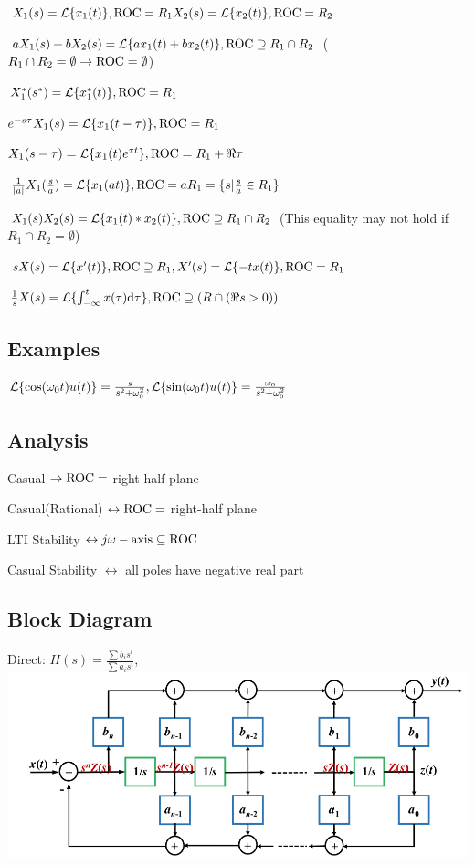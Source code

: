 $X_1(s)=\mathcal L\{ x_1(t)\},\text{ROC}=R_1 \\ X_2(s)=\mathcal L\{ x_2(t)\},\text{ROC}=R_2$

$aX_1(s) + bX_2(s) = \mathcal L\{ax_1(t) + bx_2(t)\}, \text{ROC}\supseteq R_1\cap R_2 $ 
($R_1\cap R_2=\emptyset\to \text{ROC}=\emptyset$)

$X_1^*(s^*)=\mathcal L\{x_1^*(t)\}, \text{ROC}=R_1$

$e^{-s\tau}X_1(s)=\mathcal L\{x_1(t-\tau)\}, \text{ROC}=R_1$

$X_1(s-\tau)=\mathcal L\{x_1(t)e^{\tau t}\}, \text{ROC}=R_1+\Re{\tau}$

$\frac{1}{|a|}X_1(\frac s a)=\mathcal L\{x_1(at)\}, \text{ROC}=aR_1=\{s|\frac s a \in R_1\}$

$X_1(s)X_2(s)=\mathcal L\{x_1(t) * x_2(t) \}, \text{ROC} \supseteq R_1\cap R_2$ (This equality may not hold if $R_1\cap R_2=\emptyset$)

$sX(s)=\mathcal L\{x'(t)\}, \text{ROC} \supseteq R_1, X'(s)=\mathcal L\{-tx(t)\}, \text{ROC} = R_1$

$\frac 1 sX(s)=\mathcal L\{\int_{-\infty}^t x(\tau)\mathrm{d} \tau\}, \text{ROC} \supseteq (R\cap (\Re s>0))$

\subsection*{Examples}

$\mathcal L\{\cos(\omega_0 t) u(t)\} = \frac{s}{s^2+\omega_0^2}, \mathcal L\{\sin(\omega_0 t) u(t)\} = \frac{\omega_0}{s^2+\omega_0^2}$

\subsection*{Analysis}

Casual $\to\text{ROC}=$ right-half plane

Casual(Rational) $\leftrightarrow\text{ROC}=$ right-half plane

LTI Stability $\leftrightarrow j\omega-\text{axis}\subseteq\text{ROC}$

Casual Stability $\leftrightarrow$ all poles have negative real part 

\subsection*{Block Diagram}

Direct: $H(s) = \frac{\sum b_is^i}{\sum a_is^i}$, \includegraphics[scale=0.2]{inhalt/direct.png}


